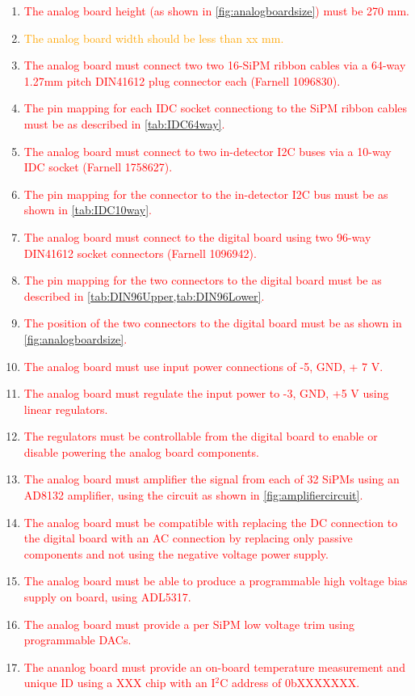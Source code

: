 \documentclass[a4paper]{article}
\newcommand{\must}[1]{\textcolor{red}{#1}}
\newcommand{\should}[1]{\textcolor{orange}{#1}}
\def\I2C{I$^2$C}
\begin{document}
\begin{enumerate}
    \item \must{The analog board height (as shown in \cref{fig:analogboardsize}) must be 270 mm.}
    \item \should{The analog board width should be less than xx mm.}
    \item \must{The analog board must connect two two 16-SiPM ribbon cables via a 64-way 1.27mm pitch DIN41612 plug connector each (Farnell 1096830).}
    \item \must{The pin mapping for each IDC socket connectiong to the SiPM ribbon cables must be as described in \cref{tab:IDC64way}.}
    \item \must{The analog board must connect to two in-detector I2C buses via a 10-way IDC socket (Farnell 1758627).}
    \item \must{The pin mapping for the connector to the in-detector I2C bus must be as shown in \cref{tab:IDC10way}.}
    \item \must{The analog board must connect to the digital board using two 96-way DIN41612 socket connectors (Farnell 1096942).}
    \item \must{The pin mapping for the two connectors to the digital board must be as described in \cref{tab:DIN96Upper,tab:DIN96Lower}.}
    \item \must{The position of the two connectors to the digital board must be as shown in \cref{fig:analogboardsize}.}
    \item \must{The analog board must use input power connections of -5, GND, + 7 V.}
    \item \must{The analog board must regulate the input power to -3, GND, +5 V using linear regulators.}
    \item \must{The regulators must be controllable from the digital board to enable or disable powering the analog board components.}
    \item \must{The analog board must amplifier the signal from each of 32 SiPMs using an AD8132 amplifier, using the circuit as shown in \cref{fig:amplifiercircuit}.}
    \item \must{The analog board must be compatible with replacing the DC connection to the digital board with an AC connection by replacing only passive components and not using the negative voltage power supply.}
    \item \must{The analog board must be able to produce a programmable high voltage bias supply on board, using ADL5317.}
    \item \must{The analog board must provide a per SiPM low voltage trim using programmable DACs.}
    \item \must{The ananlog board must provide an on-board temperature measurement and unique ID using a XXX chip with an \I2C address of 0bXXXXXXX.} 
\end{enumerate}
\end{document}
